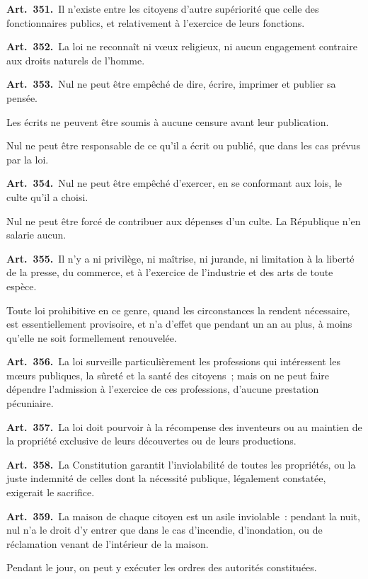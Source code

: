 \documentclass[french,twoside]{book} %
\newcommand{\labelchar}[1]{\textbf{\color{rubric} #1}}
\begin{document}
\labelchar{Art. 351.} Il n’existe entre les citoyens d’autre supériorité que celle des fonctionnaires publics, et relativement à l’exercice de leurs fonctions.\par
\labelchar{Art. 352.} La loi ne reconnaît ni vœux religieux, ni aucun engagement contraire aux droits naturels de l’homme.\par
\labelchar{Art. 353.} Nul ne peut être empêché de dire, écrire, imprimer et publier sa pensée.\par
Les écrits ne peuvent être soumis à aucune censure avant leur publication.\par
Nul ne peut être responsable de ce qu’il a écrit ou publié, que dans les cas prévus par la loi.\par
\labelchar{Art. 354.} Nul ne peut être empêché d’exercer, en se conformant aux lois, le culte qu’il a choisi.\par
Nul ne peut être forcé de contribuer aux dépenses d’un culte. La République n’en salarie aucun.\par
\labelchar{Art. 355.} Il n’y a ni privilège, ni maîtrise, ni jurande, ni limitation à la liberté de la presse, du commerce, et à l’exercice de l’industrie et des arts de toute espèce.\par
Toute loi prohibitive en ce genre, quand les circonstances la rendent nécessaire, est essentiellement provisoire, et n’a d’effet que pendant un an au plus, à moins qu’elle ne soit formellement renouvelée.\par
\labelchar{Art. 356.} La loi surveille particulièrement les professions qui intéressent les mœurs publiques, la sûreté et la santé des citoyens ; mais on ne peut faire dépendre l’admission à l’exercice de ces professions, d’aucune prestation pécuniaire.\par
\labelchar{Art. 357.} La loi doit pourvoir à la récompense des inventeurs ou au maintien de la propriété exclusive de leurs découvertes ou de leurs productions.\par
\labelchar{Art. 358.} La Constitution garantit l’inviolabilité de toutes les propriétés, ou la juste indemnité de celles dont la nécessité publique, légalement constatée, exigerait le sacrifice.\par
\labelchar{Art. 359.} La maison de chaque citoyen est un asile inviolable : pendant la nuit, nul n’a le droit d’y entrer que dans le cas d’incendie, d’inondation, ou de réclamation venant de l’intérieur de la maison.\par
Pendant le jour, on peut y exécuter les ordres des autorités constituées.\par
\end{document}
